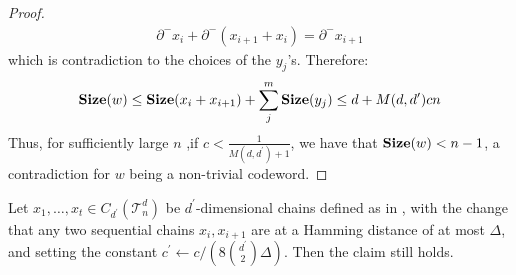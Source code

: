 \begin{proof}
\begin{equation*}
    \begin{split}
    \partial^{-}x_{i} + \partial^{-}(x_{i+1} + x_{i})  = \partial^{-}x_{i+1}
    \end{split}
  \end{equation*}
  which is contradiction to the choices of the $y_{j}$'s.  Therefore:
\begin{equation*}
  \begin{split}
    \mathbf{Size}( w ) \le \mathbf{Size}(  x_{i} + x_{i+1} ) + \sum_{j}^{m} \mathbf{Size}(y_{j}) \le d + M(d,d^{\prime}) c n  
  \end{split}
\end{equation*}
Thus, for sufficiently large $n$ ,if $c < \frac{1}{M(d,d^{\prime})+1}$, we have that $\mathbf{Size}(w) < n-1$, a contradiction for $w$ being a non-trivial codeword.
\end{proof}



\begin{claim}
  \label{claim:barrierconstant}
  Let $x_{1}, \ldots, x_{t} \in C_{d^{\prime}}(\mathcal{T}_n^d)$ be $d^{\prime}$-dimensional chains defined as in , with the change that any two sequential chains $x_{i}, x_{i+1}$ are at a Hamming distance of at most $\Delta$, and setting the constant $c^{\prime} \leftarrow c/(8{ d^{\prime} \choose 2 }  \Delta )$. Then the claim still holds.
\end{claim}

